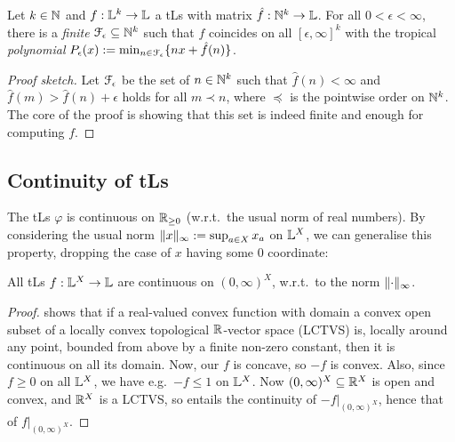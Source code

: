 \begin{theorem}\label{theorem:fepsilon}
 Let $k\in\mathbb{N}$ and $f:\mathbb{L}^k\to\mathbb{L}$ a tLs with matrix $\hat{f}:\mathbb{N}^k\to\mathbb{L}$.
 For all $0<\epsilon<\infty$, there is a \emph{finite} $\mathcal{F}_\epsilon \subseteq \mathbb{N}^k$ such that 
% 
$f$ coincides on all $[\epsilon,\infty]^k$ with the tropical \emph{polynomial} $P_\epsilon(x):=\min_{n\in \mathcal{F}_\epsilon}\{nx+\hat{f}(n)\}$.
\end{theorem}
\begin{proof}[Proof sketch]
Let $\mathcal{F}_\epsilon$ be the set of $n\in\mathbb{N}^{k}$ such that 
$\widehat f(n)<\infty$ and $\widehat f(m)> \widehat f(n)+\epsilon$ holds for all $m\prec n$, where $\preceq$ is the pointwise order on $\mathbb{N}^k$.
The core of the proof is showing that this set is indeed finite and enough for computing $f$.
\end{proof}




\subsection{Continuity of tLs}\label{subsec:cont}%

The tLs $\varphi$ is continuous on $\mathbb{R}_{\geq0}$ (w.r.t.\ the usual norm of real numbers).
By considering the usual norm $\lVert x\rVert_\infty:=\sup_{a\in X} x_a$ on $\mathbb{L}^X$, we can generalise this property, dropping the case of $x$ having some $0$ coordinate:

\begin{theorem}\label{thm:cont}
 All tLs $f:\mathbb{L}^X\to\mathbb{L}$ are continuous on $(0,\infty)^X$, w.r.t.\ to the norm $\lVert\cdot\rVert_\infty$.
\end{theorem}
\begin{proof}
\cite[Proposition 4.4.(3)]{Cobzas2017} shows that if a real-valued convex function with domain a convex open subset of a locally convex topological $\mathbb{R}$-vector space (LCTVS) is, locally around any point, bounded from above by a finite non-zero constant, then it is continuous on all its domain.
Now, our $f$ is concave, so $-f$ is convex.
Also, since $f\geq 0$ on all $\mathbb{L}^X$, we have e.g.\ $-f\leq 1$ on $\mathbb{L}^X$.
Now $(0,\infty)^X\subseteq \mathbb{R}^X$ is open and convex, and {\color{red}$\mathbb{R}^X$ is a LCTVS}, so \cite[Proposition 4.4.(3)]{Cobzas2017} entails the continuity of $-f\big|_{(0,\infty)^X}$, hence that of $f\big|_{(0,\infty)^X}$.
\end{proof}

